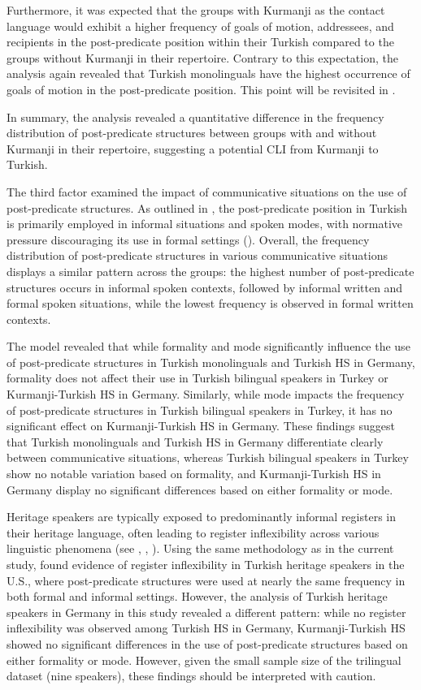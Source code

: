 Furthermore, it was expected that the groups with Kurmanji as the contact language would exhibit a higher frequency of goals of motion, addressees, and recipients in the post-predicate position within their Turkish compared to the groups without Kurmanji in their repertoire. Contrary to this expectation, the analysis again revealed that Turkish monolinguals have the highest occurrence of goals of motion in the post-predicate position. This point will be revisited in .

In summary, the analysis revealed a quantitative difference in the frequency distribution of post-predicate structures between groups with and without Kurmanji in their repertoire, suggesting a potential CLI from Kurmanji to Turkish.

The third factor examined the impact of communicative situations on the use of post-predicate structures. As outlined in , the post-predicate position in Turkish is primarily employed in informal situations and spoken modes, with normative pressure discouraging its use in formal settings (\citealt{Erguvanli1984, Schroeder1995}). Overall, the frequency distribution of post-predicate structures in various communicative situations displays a similar pattern across the groups: the highest number of post-predicate structures occurs in informal spoken contexts, followed by informal written and formal spoken situations, while the lowest frequency is observed in formal written contexts.

The model revealed that while formality and mode significantly influence the use of post-predicate structures in Turkish monolinguals and Turkish HS in Germany, formality does not affect their use in Turkish bilingual speakers in Turkey or Kurmanji-Turkish HS in Germany. Similarly, while mode impacts the frequency of post-predicate structures in Turkish bilingual speakers in Turkey, it has no significant effect on Kurmanji-Turkish HS in Germany. These findings suggest that Turkish monolinguals and Turkish HS in Germany differentiate clearly between communicative situations, whereas Turkish bilingual speakers in Turkey show no notable variation based on formality, and Kurmanji-Turkish HS in Germany display no significant differences based on either formality or mode.

Heritage speakers are typically exposed to predominantly informal registers in their heritage language, often leading to register inflexibility across various linguistic phenomena (see \citealt{WieseEtAl2022}, \citealt{AlexiadouRizou2023}, \citealt{OzsoyEtAl2022}). Using the same methodology as in the current study, \citet{SchroederEtAl2024} found evidence of register inflexibility in Turkish heritage speakers in the U.S., where post-predicate structures were used at nearly the same frequency in both formal and informal settings. However, the analysis of Turkish heritage speakers in Germany in this study revealed a different pattern: while no register inflexibility was observed among Turkish HS in Germany, Kurmanji-Turkish HS showed no significant differences in the use of post-predicate structures based on either formality or mode. However, given the small sample size of the trilingual dataset (nine speakers), these findings should be interpreted with caution.

